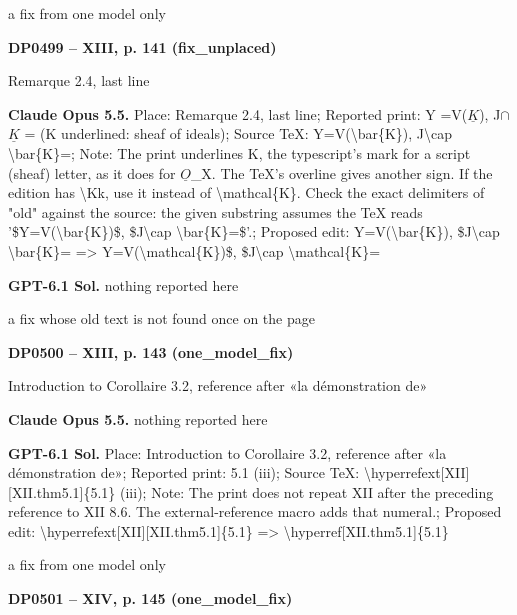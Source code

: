 a fix from one model only\par
\par\noindent\hypertarget{DP0499}{}\textbf{DP0499 -- XIII, p. 141 (fix\_unplaced)}\par
Remarque 2.4, last line\par
\textbf{Claude Opus 5.5.} Place: Remarque 2.4, last line; Reported print: Y =\allowbreak  V(\ensuremath{\underline{K}}), J\ensuremath{\cap}\ensuremath{\underline{K}} = (K underlined: sheaf of ideals); Source TeX: Y=\allowbreak V(\textbackslash{}bar\{K\}), J\textbackslash{}cap \textbackslash{}bar\{K\}=; Note: The print underlines K, the typescript's mark for a script (sheaf) letter, as it does for \ensuremath{\underline{O}}\_X. The TeX's overline gives another sign. If the edition has \textbackslash{}Kk, use it instead of \textbackslash{}mathcal\{K\}. Check the exact delimiters of "old" against the source: the given substring assumes the TeX reads '\$Y=\allowbreak V(\textbackslash{}bar\{K\})\$, \$J\textbackslash{}cap \textbackslash{}bar\{K\}=\$'.; Proposed edit: Y=\allowbreak V(\textbackslash{}bar\{K\}), \$J\textbackslash{}cap \textbackslash{}bar\{K\}= =\allowbreak > Y=\allowbreak V(\textbackslash{}mathcal\{K\})\$, \$J\textbackslash{}cap \textbackslash{}mathcal\{K\}=\par
\textbf{GPT-6.1 Sol.} nothing reported here\par
a fix whose old text is not found once on the page\par
\par\noindent\hypertarget{DP0500}{}\textbf{DP0500 -- XIII, p. 143 (one\_model\_fix)}\par
Introduction to Corollaire 3.2, reference after «la démonstration de»\par
\textbf{Claude Opus 5.5.} nothing reported here\par
\textbf{GPT-6.1 Sol.} Place: Introduction to Corollaire 3.2, reference after «la démonstration de»; Reported print: 5.1 (iii); Source TeX: \textbackslash{}hyperrefext[XII][XII.thm5.1]\{5.1\} (iii); Note: The print does not repeat XII after the preceding reference to XII 8.6. The external-reference macro adds that numeral.; Proposed edit: \textbackslash{}hyperrefext[XII][XII.thm5.1]\{5.1\} =\allowbreak > \textbackslash{}hyperref[XII.thm5.1]\{5.1\}\par
a fix from one model only\par
\par\noindent\hypertarget{DP0501}{}\textbf{DP0501 -- XIV, p. 145 (one\_model\_fix)}\par
